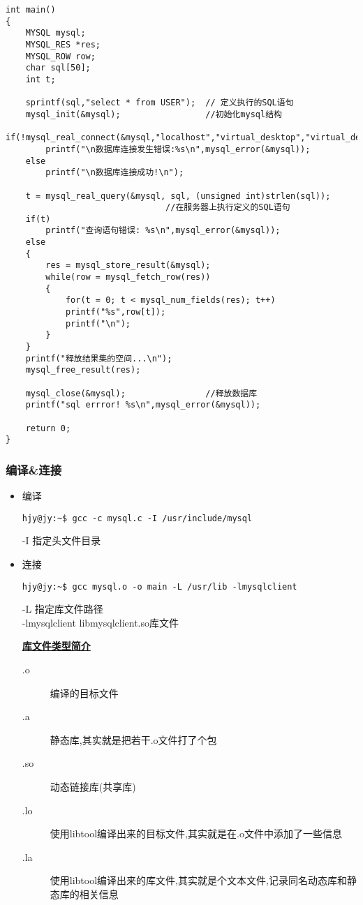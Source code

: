 \begin{itemize}
\begin{lstlisting}[style=C]
int main()
{
	MYSQL mysql;
	MYSQL_RES *res;
	MYSQL_ROW row;
	char sql[50];
	int t;
	
	sprintf(sql,"select * from USER"); 	// 定义执行的SQL语句
	mysql_init(&mysql); 				//初始化mysql结构
	if(!mysql_real_connect(&mysql,"localhost","virtual_desktop","virtual_desktop","virtual_desktop",3306,NULL,0))
		printf("\n数据库连接发生错误:%s\n",mysql_error(&mysql));
	else
		printf("\n数据库连接成功!\n");
		
	t = mysql_real_query(&mysql, sql, (unsigned int)strlen(sql));
								//在服务器上执行定义的SQL语句
	if(t)
		printf("查询语句错误: %s\n",mysql_error(&mysql));
	else
	{
		res = mysql_store_result(&mysql);
		while(row = mysql_fetch_row(res))
		{
			for(t = 0; t < mysql_num_fields(res); t++)
			printf("%s",row[t]);
			printf("\n");
		}
	}
	printf("释放结果集的空间...\n");
	mysql_free_result(res);
	
	mysql_close(&mysql); 				//释放数据库
	printf("sql errror! %s\n",mysql_error(&mysql));
	
	return 0;
}
\end{lstlisting}
\end{itemize}


\subsubsection{编译\&{}连接}
\begin{itemize}
\item 编译
\begin{lstlisting}[style=BASH]
hjy@jy:~$ gcc -c mysql.c -I /usr/include/mysql
\end{lstlisting}
-I 指定头文件目录

\item 连接
\begin{lstlisting}[style=BASH]
hjy@jy:~$ gcc mysql.o -o main -L /usr/lib -lmysqlclient
\end{lstlisting}
-L 指定库文件路径\\
-lmysqlclient libmysqlclient.so库文件

\textbf{\underline{库文件类型简介}}
\begin{description}
\item[.o]	编译的目标文件
\item[.a]	静态库,其实就是把若干.o文件打了个包
\item[.so]	动态链接库(共享库)
\item[.lo]	使用libtool编译出来的目标文件,其实就是在.o文件中添加了一些信息
\item[.la]	使用libtool编译出来的库文件,其实就是个文本文件,记录同名动态库和静态库的相关信息
\end{description}

\end{itemize}